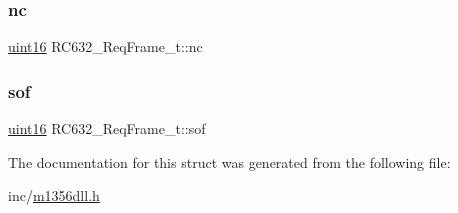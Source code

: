 \mbox{\label{struct_r_c632___req_frame__t_a09ca61a8ee262ee7c98669cd3226510b}} 
\subsubsection{\texorpdfstring{nc}{nc}}
{\footnotesize\ttfamily \mbox{\hyperlink{inc_2m1356dll_8h_a05f6b0ae8f6a6e135b0e290c25fe0e4e}{uint16}} R\+C632\+\_\+\+Req\+Frame\+\_\+t\+::nc}

\mbox{\label{struct_r_c632___req_frame__t_a737aa31dee20b759864099b808dbe156}} 
\subsubsection{\texorpdfstring{sof}{sof}}
{\footnotesize\ttfamily \mbox{\hyperlink{inc_2m1356dll_8h_a05f6b0ae8f6a6e135b0e290c25fe0e4e}{uint16}} R\+C632\+\_\+\+Req\+Frame\+\_\+t\+::sof}



The documentation for this struct was generated from the following file\+:\begin{DoxyCompactItemize}
\item 
inc/\mbox{\hyperlink{inc_2m1356dll_8h}{m1356dll.\+h}}\end{DoxyCompactItemize}
